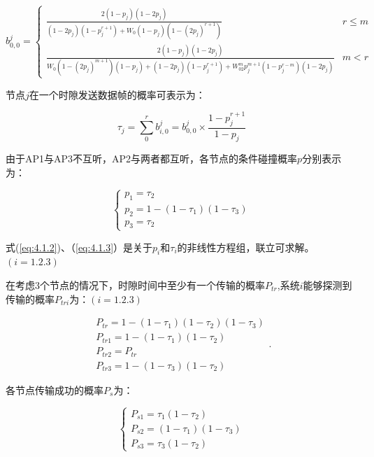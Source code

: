 \documentclass[bwprint]{gmcmthesis}
\begin{document}
\begin{equation}
b_{0,0}^j=\left\{\begin{matrix}
 \frac{2(1-p_j)(1-2p_j)}{(1-2p_j)(1-p_j^{r+1})+W_0(1-p_j)(1-(2p_j)^{r+1})}  & r\le m\\
 \frac{2(1-p_j)(1-2p_j)}{W_0(1-(2p_j)^{m+1})(1-p_j)+(1-2p_j)(1-p_j^{r+1})+W_02^mp_j^{m+1}(1-p_j^{r-m})(1-2p_j)}   & m<r
\end{matrix}\right.
    \label{eq:4.1.1}
\end{equation}

节点$j$在一个时隙发送数据帧的概率可表示为：

\begin{equation}
\tau_j = {\displaystyle \sum_{0}^{r}} b_{i,0}^j=b_{0,0}^j\times  \frac{1-p_j^{r+1}}{1-p_j} 
    \label{eq:4.1.2}
\end{equation}

由于AP1与AP3不互听，AP2与两者都互听，各节点的条件碰撞概率$p$分别表示为：

\begin{equation}
\left\{\begin{array}{l}
    p_1=\tau_2\\
    p_2=1-(1-\tau_1)(1-\tau_3)\\
    p_3=\tau_2 
    \label{eq:4.1.3}
\end{array}\right.
\end{equation}

式(\ref{eq:4.1.2})、（\ref{eq:4.1.3}）是关于$p_i$和$\tau_i$的非线性方程组，联立可求解。 \ \ \ $(i=1.2.3)$

在考虑3个节点的情况下，时隙时间中至少有一个传输的概率$P_{tr}$,系统$i$能够探测到传输的概率$P_{tri}$为：$(i=1.2.3)$

\begin{equation}
\begin{array}{l}
P_{tr}=1-(1-\tau_1)(1-\tau_2)(1-\tau_3)\\
P_{tr1}=1-(1-\tau_1)(1-\tau_2) \\
P_{tr2}=P_{tr} \\
P_{tr3}=1-(1-\tau_3)(1-\tau_2)
\end{array}.
    \label{eq:4.1.4}
\end{equation}

各节点传输成功的概率$P_s$为：

\begin{equation}
\left\{\begin{array}{l}
P_{s1}=\tau_1(1-\tau_2)\\
P_{s2}=(1-\tau_1)(1-\tau_3)\\
P_{s3}=\tau_3(1-\tau_2)
\end{array}\right.
    \label{eq:4.1.5}
\end{equation}
\end{document}

